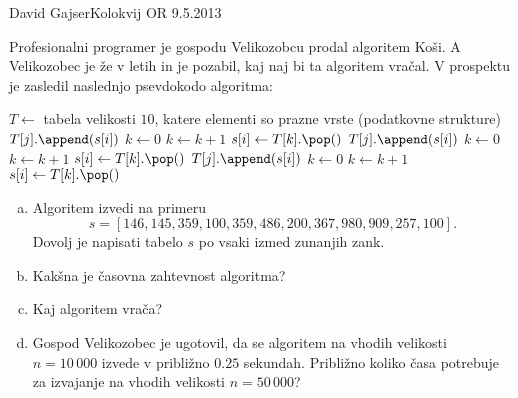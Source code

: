 \begin{naloga}{David Gajser}{Kolokvij OR 9.5.2013}
\begin{vprasanje}
Profesionalni programer je gospodu Velikozobcu prodal algoritem {\sc Koši}.
A Velikozobec je že v letih in je pozabil, kaj naj bi ta algoritem vračal.
V prospektu je zasledil naslednjo psevdokodo algoritma:
\begin{small}
\begin{algorithmic}
\State $T \gets$ tabela velikosti $10$,
    katere elementi so prazne vrste (podatkovne strukture)
            \State $T[j].\append(s[i])$
        \EndIf
    \EndFor
\EndFor
\State $k \gets 0$
        \State $k \gets k+1$
    \EndWhile
    \State $s[i] \gets T[k].\pop()$
\EndFor
{}
            \State $T[j].\append(s[i])$
        \EndIf
    \EndFor
\EndFor
\State $k \gets 0$
        \State $k \gets k+1$
    \EndWhile
    \State $s[i] \gets T[k].\pop()$
\EndFor
{}
            \State $T[j].\append(s[i])$
        \EndIf
    \EndFor
\EndFor
\State $k \gets 0$
        \State $k \gets k+1$
    \EndWhile
    \State $s[i] \gets T[k].\pop()$
\EndFor
\State {}
\end{algorithmic}
\end{small}

\begin{enumerate}[(a)]
\item Algoritem izvedi na primeru
$$
s = [146, 145, 359, 100, 359, 486, 200, 367, 980, 909, 257, 100] .
$$
Dovolj je napisati tabelo $s$ po vsaki izmed zunanjih zank.

\item Kakšna je časovna zahtevnost algoritma?

\item Kaj algoritem vrača?

\item Gospod Velikozobec je ugotovil,
da se algoritem na vhodih velikosti $n = 10\,000$
izvede v približno $0.25$ sekundah.
Približno koliko časa potrebuje za izvajanje
na vhodih velikosti $n = 50\,000$?
\end{enumerate}
\end{vprasanje}
\begin{odgovor}
\end{odgovor}
\end{naloga}
